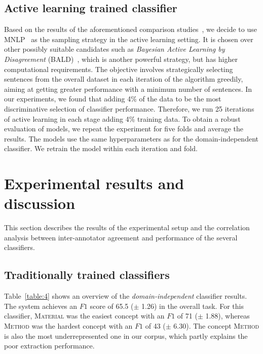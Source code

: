 \documentclass[runningheads]{llncs}
\begin{document}
\subsection{Active learning trained classifier}
Based on the results of the aforementioned comparison studies~\cite{Siddhant2018DeepBA,Zhang2016ActiveDT}, we decide to use MNLP~\cite{Shen2017DeepAL} as the sampling strategy in the active learning setting. It is chosen over other possibly suitable candidates such as \emph{Bayesian Active Learning by Disagreement} (BALD)~\cite{Houlsby2011BayesianAL}, which is another powerful strategy, but has higher computational requirements.
The objective involves strategically selecting sentences from the overall dataset in each iteration of the algorithm greedily, aiming at getting greater performance with a minimum number of sentences. In our experiments, we found that adding 4\% of the data to be the most discriminative selection of classifier performance. Therefore, we run 25 iterations of active learning in each stage adding 4\% training data. To obtain a robust evaluation of models, we repeat the experiment for five folds and average the results. 
The models use the same hyperparameters as for the domain-independent classifier. We retrain the model within each iteration and fold. 

\section{Experimental results and discussion}
This section describes the results of the experimental setup and the correlation analysis between inter-annotator agreement and performance of the several classifiers.

\subsection{Traditionally trained classifiers}
Table~\ref{table:4} shows an overview of the \textit{domain-independent} classifier results. The system achieves an $F1$ score of 65.5 ($\pm$ 1.26) in the overall task. For this classifier, \textsc{Material} was the easiest concept with an $F1$ of 71 ($\pm$ 1.88), whereas \textsc{Method} was the hardest concept with an $F1$ of 43 ($\pm$ 6.30). 
The concept \textsc{Method} is also the most underrepresented one in our corpus, which partly explains the poor extraction performance.
\end{document}
